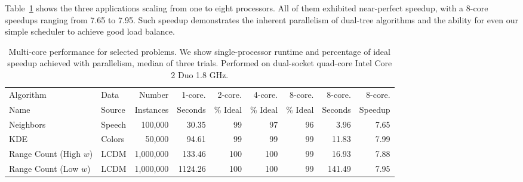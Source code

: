 \documentclass[twoside,leqno,twocolumn]{article}
\newcommand{\fig}[1]{Figure~\ref{fig:#1}}
\newcommand{\tab}[1]{Table~\ref{tab:#1}}
\begin{document}
\tab{maquis} shows the three applications scaling from one to eight processors.
All of them exhibited near-perfect speedup, with a 8-core speedups ranging from 7.65 to 7.95.
Such speedup demonstrates the inherent parallelism of dual-tree algorithms and the ability for even our simple scheduler to achieve good load balance.

\begin{table}
  \centering
  \begin{tabular}{|l|l|r|r||r|r|r||r|r|}
    \hline
    Algorithm               & Data      & Number     & 1-core. & 2-core.  & 4-core.  & 8-core.  & 8-core. & 8-core.
    \\
    Name                    & Source    & Instances  & Seconds & \% Ideal & \% Ideal & \% Ideal & Seconds & Speedup
    \\ \hline \hline
    Neighbors               & Speech    & 100,000  & 30.35  & 99 & 97 & 96 & 3.96 & 7.65
    \\ \hline
    KDE                     & Colors    & 50,000    & 94.61 & 99 & 99 & 99 & 11.83 & 7.99
    \\ \hline
    Range Count (High $w$)  & LCDM      & 1,000,000  & 133.46 & 100 & 100 & 99 & 16.93 & 7.88
    \\ \hline
    Range Count (Low $w$)   & LCDM      & 1,000,000 & 1124.26 & 100 & 100 & 99 & 141.49 & 7.95
    \\ \hline
  \end{tabular}
  \caption{
  \label{tab:maquis}
  Multi-core performance for selected problems.
  We show single-processor runtime and percentage of ideal speedup achieved with parallelism, median of three trials.
  Performed on dual-socket quad-core Intel Core 2 Duo 1.8 GHz.
  }
\end{table}

\end{document}
